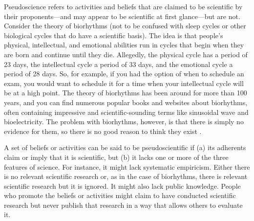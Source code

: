 
Pseudoscience refers to activities and beliefs that are claimed to be scientific by their proponents---and may appear to be scientific at first glance---but are not. Consider the theory of biorhythms (not to be confused with sleep cycles or other biological cycles that do have a scientific basis). The idea is that people's physical, intellectual, and emotional abilities run in cycles that begin when they are born and continue until they die. Allegedly, the physical cycle has a period of 23 days, the intellectual cycle a period of 33 days, and the emotional cycle a period of 28 days. So, for example, if you had the option of when to schedule an exam, you would want to schedule it for a time when your intellectual cycle will be at a high point. The theory of biorhythms has been around for more than 100 years, and you can find numerous popular books and websites about biorhythms, often containing impressive and scientific-sounding terms like sinusoidal wave and bioelectricity. The problem with biorhythms, however, is that there is simply no evidence for them, so there is no good reason to think they exist \citep{hines_comprehensive_1998}.

A set of beliefs or activities can be said to be pseudoscientific if (a) its adherents claim or imply that it is scientific, but (b) it lacks one or more of the three features of science. For instance, it might lack systematic empiricism. Either there is no relevant scientific research or, as in the case of biorhythms, there is relevant scientific research but it is ignored. It might also lack public knowledge. People who promote the beliefs or activities might claim to have conducted scientific research but never publish that research in a way that allows others to evaluate it.

